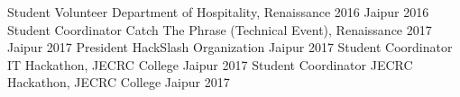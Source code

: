 \begin{cvhonors}
  \cvhonor
    {Student Volunteer}
    {Department of Hospitality, Renaissance 2016}
    {Jaipur}
    {2016}
  \cvhonor
    {Student Coordinator}
    {Catch The Phrase (Technical Event), Renaissance 2017}
    {Jaipur}
    {2017}
  \cvhonor
    {President}
    {HackSlash Organization}
    {Jaipur}
    {2017}
  \cvhonor
    { Student Coordinator}
    {IT Hackathon, JECRC College}
    {Jaipur}
    {2017}
  \cvhonor
    { Student Coordinator}
    {JECRC Hackathon, JECRC College}
    {Jaipur}
    {2017}
\end{cvhonors}